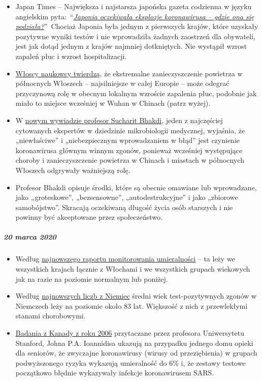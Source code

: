 \begin{itemize}
\tightlist
\item
  Japan Times -- Największa i najstarsza japońska gazeta codzienna w
  języku angielskim
  pyta:~``\href{https://www.japantimes.co.jp/news/2020/03/20/national/coronavirus-explosion-expected-japan/}{\emph{Japonia
  oczekiwała eksplozje koronawirusa -- gdzie ona się
  podziała?}}''~Chociaż Japonia była jednym z pierwszych krajów, które
  uzyskały pozytywne wyniki testów i nie wprowadziła żadnych zaostrzeń
  dla obywateli, jest jak dotąd jednym z krajów najmniej dotkniętych.
  Nie wystąpił wzrost zapaleń płuc i wzrost hospitalizacji.
\item
  \href{https://www.heise.de/tp/features/Feinstaubpartikel-als-Viren-Vehikel-4687454.html}{Włoscy
  naukowcy twierdzą}, że ekstremalne zanieczyszczenie powietrza w
  północnych Włoszech -- najsilniejsze w całej Europie -- może odegrać
  przyczynową rolę w obecnym lokalnym wzroście zapalenia płuc, podobnie
  jak miało to miejsce wcześniej w Wuhan w Chinach (patrz wyżej).
\item
  W \href{https://www.youtube.com/watch?v=JBB9bA-gXL4}{nowym wywiadzie
  profesor Sucharit Bhakdi}, jeden z najczęściej cytowanych ekspertów w
  dziedzinie mikrobiologii medycznej, wyjaśnia, że „niewłaściwe'' i
  „niebezpiecznym wprowadzaniem w błąd'' jest czynienie koronawirusa
  głównym winnym zgonów, ponieważ wcześniej występujące choroby i
  zanieczyszczenie powietrza w Chinach i miastach w północnych Włoszech
  odgrywały ważniejszą rolę.
\item
  Profesor Bhakdi opisuje środki, które są obecnie omawiane lub
  wprowadzane, jako „groteskowe'', „bezsensowne'', „autodestrukcyjne'' i
  jako „zbiorowe samobójstwo''. Skracają oczekiwaną długość życia osób
  starszych i nie powinny być akceptowane przez społeczeństwo.
\end{itemize}

\hypertarget{20-marca-2020}{%
\subparagraph{\texorpdfstring{\textbf{20 marca
2020}}{20 marca 2020}}\label{20-marca-2020}}

\begin{itemize}
\tightlist
\item
  Według \href{https://www.euromomo.eu/index.html}{najnowszego raportu
  monitorowania umieralności} -- ta leży we wszystkich krajach łącznie z
  Włochami i we wszystkich grupach wiekowych jak na razie na poziomie
  normalnym lub poniżej.
\item
  Według
  \href{https://de.wikipedia.org/wiki/COVID-19-Pandemie_in_Deutschland\#Todesf\%C3\%A4lle_in_den_Medien}{najnowszych
  liczb z Niemiec} średni wiek test-pozytywnych zgonów w Niemczech leży
  na poziomie około 83 lat. Większość z nich z przewlekłymi stanami
  chorobowymi.
\item
  \href{https://www.ncbi.nlm.nih.gov/pmc/articles/PMC2095096/}{Badania z
  Kanady z roku 2006} przytaczane przez profesora Uniwersytetu Stanford,
  Johna P.A. Ioannidisa ukazują na przypadku jednego domu opieki dla
  seniorów, że zwyczajne koronawirusy (wirusy od przeziębienia) w
  grupach podwyższonego ryzyka wykazują umieralność do 6\% i, że zestawy
  testowe początkowo błędnie wykazywały infekcje koronawirusem SARS.
\end{itemize}

